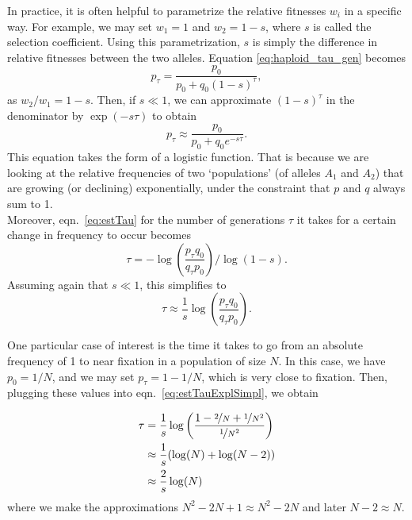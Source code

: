 In practice, it is often helpful to parametrize the relative fitnesses $w_i$ in a specific way. For example, we may set $w_1 = 1$ and $w_2 = 1 - s$, where $s$ is called the selection coefficient. Using this parametrization, $s$ is simply the difference in relative fitnesses between the two alleles. Equation \eqref{eq:haploid_tau_gen} becomes
\begin{equation}
	\label{eq:haploid_tau_gen_expl}
	p_{\tau} = \frac{p_{0}}{p_0 + q_0 (1 - s)^{\tau}},
\end{equation}
as $w_2 / w_1 = 1 - s$. Then, if $s \ll 1$, we can approximate $(1-s)^{\tau}$ in the denominator by $\exp(-s\tau)$ to obtain
\begin{equation} \label{eq:haploid_logistic growth}
	p_{\tau} \approx \frac{p_0}{p_0 + q_0 e^{-s\tau}}.
\end{equation}
This equation takes the form of a logistic function. That is because
we are looking at the relative frequencies of two `populations' (of
alleles $A_1$ and $A_2$) that are growing (or declining)
exponentially, under the constraint that $p$ and $q$ always sum to 1. \\

Moreover, eqn.\ \eqref{eq:estTau} for the number of generations $\tau$ it takes for a certain change in frequency to occur becomes
\begin{equation}
	\label{eq:estTauExpl}
	\tau = - \log \left(\frac{p_{\tau} q_0}{q_{\tau} p_0}\right) /  \log\left(1-s\right).
\end{equation}
Assuming again that $s \ll 1$, this simplifies to
\begin{equation}
	\label{eq:estTauExplSimpl}
	\tau \approx \frac{1}{s} \log \left(\frac{p_{\tau} q_0}{q_{\tau} p_0}\right).
\end{equation}


One particular case of interest is the time it takes to go from an absolute
frequency of 1 to near fixation in a population of size $N$.  In this case, we
have $p_0 = 1/N$, and we may set $p_{\tau} = 1 - 1/N$, which is very close to
fixation. Then, plugging these values into eqn.\ \eqref{eq:estTauExplSimpl}, we
obtain

\begin{align}
  \tau &= \frac{1}{s} \log\left( \frac{1 - \nicefrac{2}{N} +
      \nicefrac{1}{N^2}}{\nicefrac{1}{N^2}} \right) \nonumber \\
  &\approx \frac{1}{s} (\log(N) + \log(N-2)) \nonumber \\
  &\approx \frac{2}{s} \log(N)  \label{eq:fixTimeSimpl}
\end{align}
%
where we make the approximations $N^2 - 2N + 1 \approx N^2 - 2N$ and later
$N-2 \approx N$.



